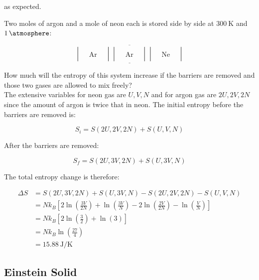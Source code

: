 as expected.

\begin{texample}
	Two moles of argon and a mole of neon each is stored side by side at $\SI{300}{\kelvin}$ and $\SI{1}{\atmosphere}$:
	
	\[\underline{\overline{ \begin{vmatrix} &  &  \\  & \mathrm{Ar} &  \\  &  & \end{vmatrix} \begin{vmatrix} &  &  \\  & \mathrm{Ar} &  \\  &  & \end{vmatrix} \begin{vmatrix} &  &  \\  & \mathrm{Ne} &  \\  &  & \end{vmatrix} }}\]
	
	How much will the entropy of this system increase if the barriers are removed and those two gases are allowed to mix freely? \\
	
	The extensive variables for neon gas are $U,V,N$ and for argon gas are $2U,2V,2N$ since the amount of argon is twice that in neon. The initial entropy before the barriers are removed is:
	
	\[S_i=S(2U,2V,2N)+S(U,V,N)\]
	
	After the barriers are removed:
	
	\[S_f=S(2U,3V,2N)+S(U,3V,N)\]
	
	The total entropy change is therefore:
	
	\begin{align*}
		\Delta S&=S(2U,3V,2N)+S(U,3V,N)-S(2U,2V,2N)-S(U,V,N) \\
		&=Nk_B\left[2\ln\left(\frac{3V}{2N}\right)+\ln\left(\frac{3V}{N}\right)-2\ln\left(\frac{2V}{2N}\right)-\ln\left(\frac{V}{N}\right)\right] \\
		&=Nk_B\left[2\ln\left(\frac{3}{2}\right)+\ln\left(3\right)\right] \\
		&=Nk_B\ln\left(\frac{27}{4}\right) \\
		&=\SI{15.88}{\joule\per\kelvin}
	\end{align*}
\end{texample}

\subsection{Einstein Solid}

